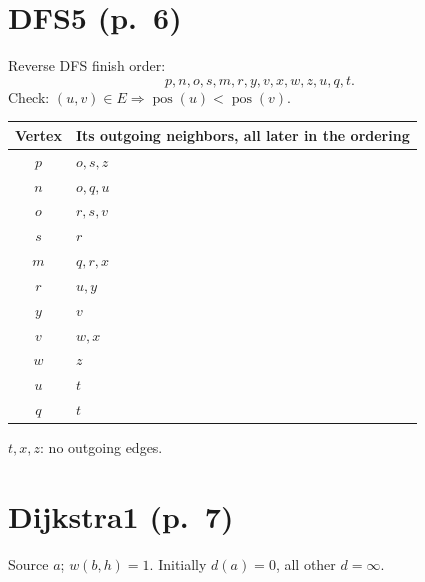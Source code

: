 \documentclass[11pt,a4paper]{article}
\newcommand{\question}[2]{\section*{#1}}
\begin{document}
\newpage
\question{DFS5 (p.\ 6)}{Topological ordering}
Reverse DFS finish order:
\[
\boxed{p,n,o,s,m,r,y,v,x,w,z,u,q,t}.
\]
Check: $(u,v)\in E\Rightarrow\operatorname{pos}(u)<\operatorname{pos}(v)$.
\begin{center}\begin{tabular}{c|l}\toprule
Vertex&Its outgoing neighbors, all later in the ordering\\\midrule
$p$&$o,s,z$\\$n$&$o,q,u$\\$o$&$r,s,v$\\$s$&$r$\\$m$&$q,r,x$\\$r$&$u,y$\\$y$&$v$\\$v$&$w,x$\\$w$&$z$\\$u$&$t$\\$q$&$t$\\\bottomrule\end{tabular}\end{center}
$t,x,z$: no outgoing edges.

\newpage
\question{Dijkstra1 (p.\ 7)}{Complete the shortest-path calculation}
Source $a$; $w(b,h)=1$. Initially $d(a)=0$, all other $d=\infty$.
\end{document}

